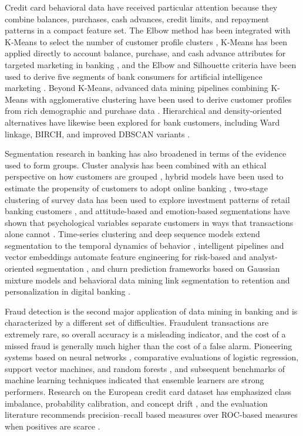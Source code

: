 \documentclass[conference]{IEEEtran}
\begin{document}
Credit card behavioral data have received particular attention because they combine balances, purchases, cash advances, credit limits, and repayment patterns in a compact feature set. The Elbow method has been integrated with K-Means to select the number of customer profile clusters \cite{syakur2018integration}, K-Means has been applied directly to account balance, purchase, and cash advance attributes for targeted marketing in banking \cite{gopalakrishnan2024}, and the Elbow and Silhouette criteria have been used to derive five segments of bank consumers for artificial intelligence marketing \cite{raiter2021}. Beyond K-Means, advanced data mining pipelines combining K-Means with agglomerative clustering have been used to derive customer profiles from rich demographic and purchase data \cite{sinap2025}. Hierarchical and density-oriented alternatives have likewise been explored for bank customers, including Ward linkage, BIRCH, and improved DBSCAN variants \cite{zakrzewska2005clustering,hassan2018,kikoria2020,yan2025}.

Segmentation research in banking has also broadened in terms of the evidence used to form groups. Cluster analysis has been combined with an ethical perspective on how customers are grouped \cite{kumar2024}, hybrid models have been used to estimate the propensity of customers to adopt online banking \cite{ganar2022}, two-stage clustering of survey data has been used to explore investment patterns of retail banking customers \cite{kovacs2021}, and attitude-based and emotion-based segmentations have shown that psychological variables separate customers in ways that transactions alone cannot \cite{swissvn2019,calvoporral2020}. Time-series clustering and deep sequence models extend segmentation to the temporal dynamics of behavior \cite{abbasimehr2021,barkhordar2021}, intelligent pipelines and vector embeddings automate feature engineering for risk-based and analyst-oriented segmentation \cite{zand2020,mousaeirad2020}, and churn prediction frameworks based on Gaussian mixture models and behavioral data mining link segmentation to retention and personalization in digital banking \cite{saxena2023,graham2025}.

Fraud detection is the second major application of data mining in banking and is characterized by a different set of difficulties. Fraudulent transactions are extremely rare, so overall accuracy is a misleading indicator, and the cost of a missed fraud is generally much higher than the cost of a false alarm. Pioneering systems based on neural networks \cite{aleskerov1997cardwatch}, comparative evaluations of logistic regression, support vector machines, and random forests \cite{bhattacharyya2011data}, and subsequent benchmarks of machine learning techniques \cite{sadgali2019performance,trivedi2020study} indicated that ensemble learners are strong performers. Research on the European credit card dataset has emphasized class imbalance, probability calibration, and concept drift \cite{dal2014learned,carcillo2018beyond}, and the evaluation literature recommends precision--recall based measures over ROC-based measures when positives are scarce \cite{saito2015precision}.
\end{document}
